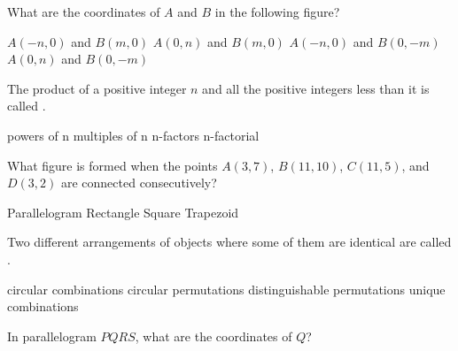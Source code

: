 \begin{questions}
\question What are the coordinates of $A$ and $B$ in the following figure? 

\begin{choices}  
\choice $A(-n, 0)$ and $B(m, 0)$ 
\CorrectChoice $A(0, n)$ and $B(m, 0)$ %
\choice $A(-n, 0)$ and $B(0, -m)$ 
\choice $A(0, n)$ and $B(0, -m)$ 
\end{choices}
\vspace*{-2cm}\hspace*{13cm} \vspace*{1.3cm}

\question The  product  of  a  positive  integer  $n$  and  all  the  positive  integers  less than  it  is called \blank.      
\begin{multicols}{4}
\begin{choices}  
\choice powers of  n
\choice multiples  of  n
\choice n-factors
\CorrectChoice n-factorial 
\end{choices}
\end{multicols} 

\question What figure is formed when the points $A(3, 7)$, $B(11, 10)$, $C(11, 5)$, and $D(3, 2)$ are connected consecutively? 

\begin{multicols}{4}
\begin{choices} 
\CorrectChoice Parallelogram
\choice Rectangle
\choice Square
\choice Trapezoid
\end{choices}
\end{multicols} 

\question Two  different  arrangements  of  objects  where  some  of  them  are identical  are  called \blank. 

\begin{multicols}{2}
\begin{choices} 
\choice circular combinations 
\choice circular permutations
\CorrectChoice  distinguishable  permutations
\choice unique  combinations 
\end{choices}
\end{multicols} 

\question In parallelogram $PQRS$, what are the coordinates of $Q$? 


\end{questions}

